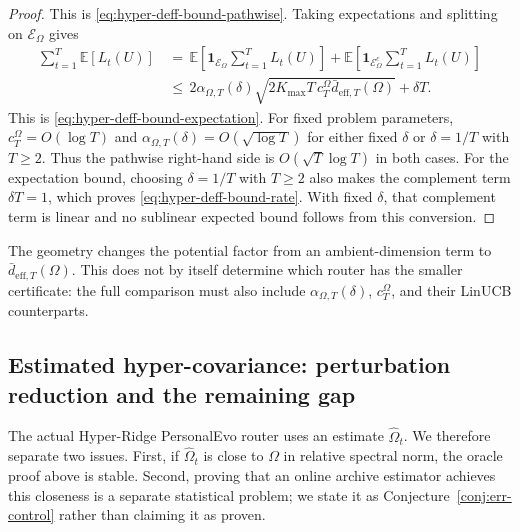 \documentclass{article} %
\begin{document}
\begin{proof}
This is \eqref{eq:hyper-deff-bound-pathwise}.  Taking expectations and splitting on \(\mathcal{E}_{\Omega}\) gives
\begin{equation}
\label{eq:hyper-deff-proof-expectation-split}
\begin{aligned}
\sum_{t=1}^{T}\mathbb{E}[L_t(U)]
&\,=\,
\mathbb{E}
\!\left[
\mathbf{1}_{\mathcal{E}_{\Omega}}
\sum_{t=1}^{T}L_t(U)
\right]
+
\mathbb{E}
\!\left[
\mathbf{1}_{\mathcal{E}_{\Omega}^{c}}
\sum_{t=1}^{T}L_t(U)
\right]
\\
&\,\leq\,
2\alpha_{\Omega,T}(\delta)
\sqrt{
2K_{\max}T\,c_T^\Omega
\bar d_{\mathrm{eff},T}(\Omega)
}
+\delta T .
\end{aligned}
\end{equation}
This is \eqref{eq:hyper-deff-bound-expectation}. For fixed problem
parameters, \(c_T^\Omega=O(\log T)\) and
\(\alpha_{\Omega,T}(\delta)=O(\sqrt{\log T})\) for either fixed \(\delta\)
or \(\delta=1/T\) with \(T\ge2\). Thus the pathwise right-hand side is
\(O(\sqrt T\log T)\) in both cases. For the expectation bound, choosing
\(\delta=1/T\) with \(T\ge2\) also makes the complement term \(\delta T=1\), which proves
\eqref{eq:hyper-deff-bound-rate}. With fixed \(\delta\), that complement term
is linear and no sublinear expected bound follows from this conversion.
\end{proof}

The geometry changes the potential factor from an ambient-dimension term to
\(\bar d_{\mathrm{eff},T}(\Omega)\). This does not by itself determine which
router has the smaller certificate: the full comparison must also include
\(\alpha_{\Omega,T}(\delta)\), \(c_T^\Omega\), and their LinUCB counterparts.

\subsection{Estimated hyper-covariance: perturbation reduction and the remaining gap}
\label{sec:theory-estimated-hyper}

The actual Hyper-Ridge PersonalEvo router uses an estimate \(\widehat{\Omega}_t\).  We therefore separate two issues.  First, if \(\widehat{\Omega}_t\) is close to \(\Omega\) in relative spectral norm, the oracle proof above is stable.  Second, proving that an online archive estimator achieves this closeness is a separate statistical problem; we state it as Conjecture~\ref{conj:err-control} rather than claiming it as proven.
\end{document}
